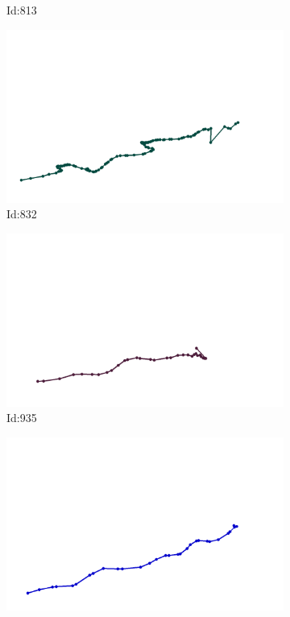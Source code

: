 \documentclass[12pt,twoside]{report}
\begin{document}
\begin{figure}
\begin{subfigure}[b]{0.20\textwidth}
\caption{Id:813}
\end{subfigure}
\begin{subfigure}[b]{0.20\textwidth}
\centering
\includegraphics[width=\textwidth]{../trajectories/832.png}
\caption{Id:832}
\end{subfigure}
\begin{subfigure}[b]{0.20\textwidth}
\centering
\includegraphics[width=\textwidth]{../trajectories/935.png}
\caption{Id:935}
\end{subfigure}
\begin{subfigure}[b]{0.20\textwidth}
\centering
\includegraphics[width=\textwidth]{../trajectories/938.png}

\end{subfigure}
\end{figure}
\end{document}
